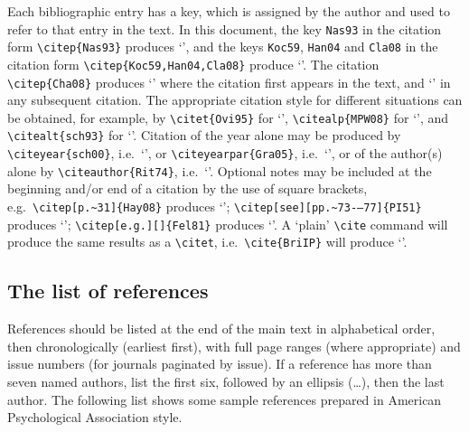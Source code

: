 \documentclass[]{interact}
\theoremstyle{plain}%
\theoremstyle{definition}
\theoremstyle{remark}
\begin{document}
Each bibliographic entry has a key, which is assigned by the author and used to refer to that entry in the text. In this document, the key \verb"Nas93" in the citation form \verb"\citep{Nas93}" produces `\citep{Nas93}', and the keys \verb"Koc59", \verb"Han04" and \verb"Cla08" in the citation form \verb"\citep{Koc59,Han04,Cla08}" produce `\citep{Koc59,Han04,Cla08}'. The citation \verb"\citep{Cha08}" produces `\citep{Cha08}' where the citation first appears in the text, and `\citep{Cha08}' in any subsequent citation. The appropriate citation style for different situations can be obtained, for example, by \verb"\citet{Ovi95}" for `\citet{Ovi95}', \verb"\citealp{MPW08}" for `\citealp{MPW08}', and \verb"\citealt{sch93}" for `\citealt{sch93}'. Citation of the year alone may be produced by \verb"\citeyear{sch00}", i.e.\ `\citeyear{sch00}', or \verb"\citeyearpar{Gra05}", i.e.\ `\citeyearpar{Gra05}', or of the author(s) alone by \verb"\citeauthor{Rit74}", i.e.\ `\citeauthor{Rit74}'. Optional notes may be included at the beginning and/or end of a citation by the use of square brackets, e.g.\ \verb"\citep[p.~31]{Hay08}" produces `\citep[p.~31]{Hay08}'; \verb"\citep[see][pp.~73-–77]{PI51}" produces `\citep[see][pp.~73--77]{PI51}'; \verb"\citep[e.g.][]{Fel81}" produces `\citep[e.g.][]{Fel81}'. A `plain' \verb"\cite" command will produce the same results as a \verb"\citet", i.e.\ \verb"\cite{BriIP}" will produce `\cite{BriIP}'.


\subsection{The list of references}

References should be listed at the end of the main text in alphabetical order, then chronologically (earliest first), with full page ranges (where appropriate) and issue numbers (for journals paginated by issue). If a reference has more than seven named authors, list the first six, followed by an ellipsis (\ldots), then the last author. The following list shows some sample references prepared in American Psychological Association style.
\end{document}
